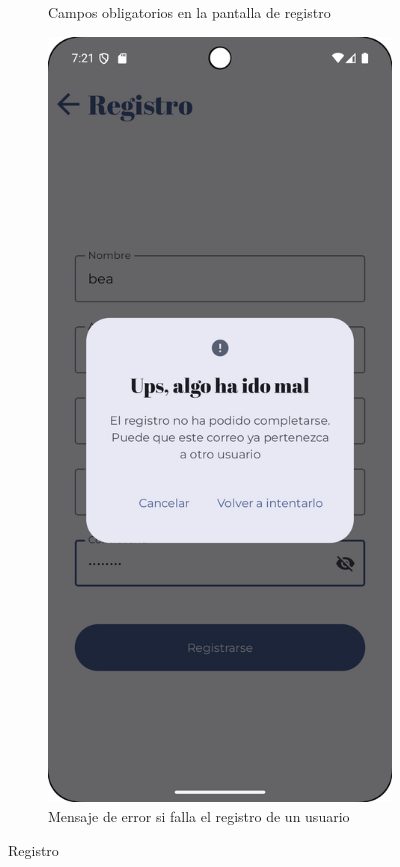 \begin{figure}[H]
\begin{subfigure}[b]{0.3\textwidth}
      \caption{Campos obligatorios en la pantalla de registro}
      \label{fig:register-must}
    \end{subfigure}
    \hfill
    \begin{subfigure}[b]{0.3\textwidth}
      \includegraphics[width=\textwidth]{./img/manual/register_error.png}
      \caption{Mensaje de error si falla el registro de un usuario}
      \label{fig:register-error}
    \end{subfigure}

    \caption{Registro}
    \label{fig:register}
\end{figure}


